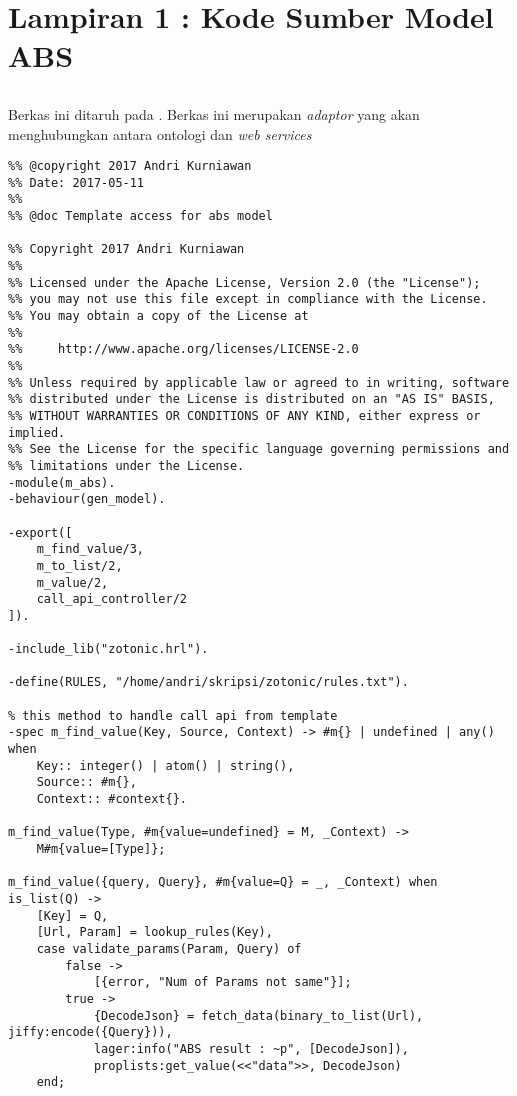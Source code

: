 \chapter*{Lampiran 1 : Kode Sumber Model ABS}
\section*{} \label{cha:lampir-abs}
Berkas ini ditaruh pada . Berkas ini merupakan \textit{adaptor} yang akan menghubungkan antara ontologi dan \textit{web services}
\begin{lstlisting}[style=L,caption={Berkas adaptor m\_abs.erl},label={lst:mabs}]
%% @author Andri Kurniawan <andrikurniawan.id@gmail.com>
%% @copyright 2017 Andri Kurniawan
%% Date: 2017-05-11
%%
%% @doc Template access for abs model

%% Copyright 2017 Andri Kurniawan
%%
%% Licensed under the Apache License, Version 2.0 (the "License");
%% you may not use this file except in compliance with the License.
%% You may obtain a copy of the License at
%%
%%     http://www.apache.org/licenses/LICENSE-2.0
%%
%% Unless required by applicable law or agreed to in writing, software
%% distributed under the License is distributed on an "AS IS" BASIS,
%% WITHOUT WARRANTIES OR CONDITIONS OF ANY KIND, either express or implied.
%% See the License for the specific language governing permissions and
%% limitations under the License.
-module(m_abs).
-behaviour(gen_model).

-export([
	m_find_value/3,
	m_to_list/2,
	m_value/2,
	call_api_controller/2
]).

-include_lib("zotonic.hrl").

-define(RULES, "/home/andri/skripsi/zotonic/rules.txt").

% this method to handle call api from template
-spec m_find_value(Key, Source, Context) -> #m{} | undefined | any() when
    Key:: integer() | atom() | string(),
    Source:: #m{},
    Context:: #context{}.

m_find_value(Type, #m{value=undefined} = M, _Context) ->
    M#m{value=[Type]};

m_find_value({query, Query}, #m{value=Q} = _, _Context) when is_list(Q) ->
	[Key] = Q,
	[Url, Param] = lookup_rules(Key),
	case validate_params(Param, Query) of
		false ->
			[{error, "Num of Params not same"}];
		true ->
			{DecodeJson} = fetch_data(binary_to_list(Url), jiffy:encode({Query})),
			lager:info("ABS result : ~p", [DecodeJson]),
			proplists:get_value(<<"data">>, DecodeJson)
	end;


\end{lstlisting}
